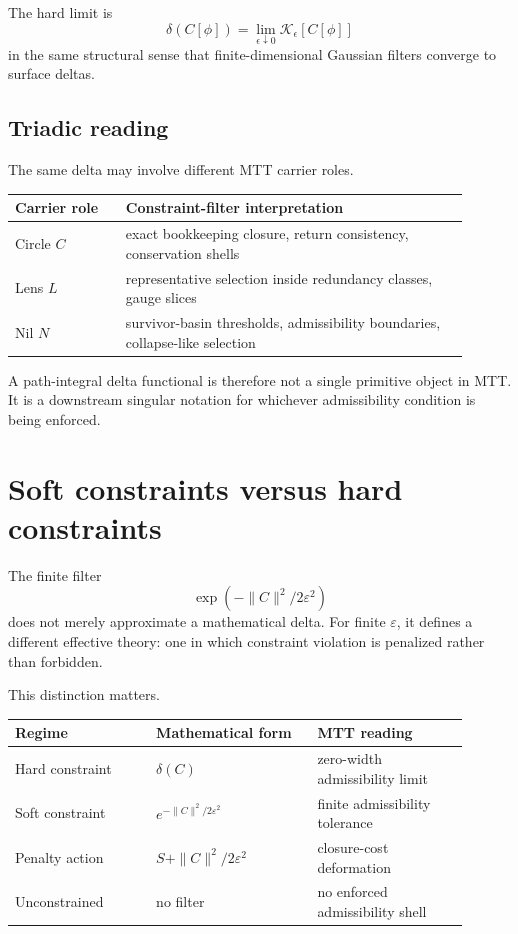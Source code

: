 \documentclass[11pt]{article}
\begin{document}
The hard limit is
\[
\delta(C[\phi])
=
\lim_{\epsilon\downarrow0}\mathcal K_\epsilon[C[\phi]]
\]
in the same structural sense that finite-dimensional Gaussian filters converge to surface
deltas.

\subsection{Triadic reading}

The same delta may involve different MTT carrier roles.

\begin{center}
\begin{tabular}{p{0.22\linewidth}p{0.68\linewidth}}
\toprule
Carrier role & Constraint-filter interpretation \\
\midrule
Circle \(C\) & exact bookkeeping closure, return consistency, conservation shells \\
Lens \(L\) & representative selection inside redundancy classes, gauge slices \\
Nil \(N\) & survivor-basin thresholds, admissibility boundaries, collapse-like selection \\
\bottomrule
\end{tabular}
\end{center}

A path-integral delta functional is therefore not a single primitive object in MTT.  It is a
downstream singular notation for whichever admissibility condition is being enforced.

\section{Soft constraints versus hard constraints}

The finite filter
\[
\exp(-\|C\|^2/2\varepsilon^2)
\]
does not merely approximate a mathematical delta.  For finite \(\varepsilon\), it defines a different
effective theory: one in which constraint violation is penalized rather than forbidden.

This distinction matters.

\begin{center}
\begin{tabular}{p{0.28\linewidth}p{0.32\linewidth}p{0.30\linewidth}}
\toprule
Regime & Mathematical form & MTT reading \\
\midrule
Hard constraint & \(\delta(C)\) & zero-width admissibility limit \\
Soft constraint & \(e^{-\|C\|^2/2\varepsilon^2}\) & finite admissibility tolerance \\
Penalty action & \(S+\|C\|^2/2\varepsilon^2\) & closure-cost deformation \\
Unconstrained & no filter & no enforced admissibility shell \\
\bottomrule
\end{tabular}
\end{center}
\end{document}
